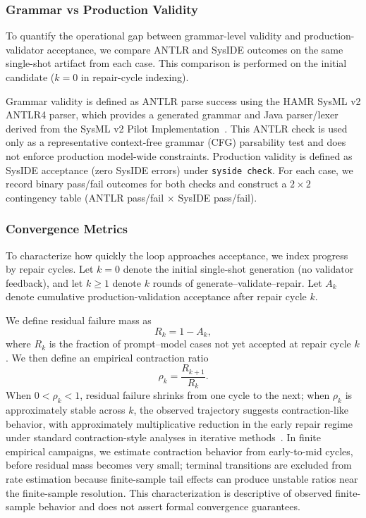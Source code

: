 \subsubsection{Grammar vs Production Validity}
To quantify the operational gap between grammar-level validity and production-validator acceptance, we compare ANTLR and SysIDE outcomes on the same single-shot artifact from each case. This comparison is performed on the initial candidate ($k=0$ in repair-cycle indexing).

Grammar validity is defined as ANTLR parse success using the HAMR SysML v2 ANTLR4 parser, which provides a generated grammar and Java parser/lexer derived from the SysML v2 Pilot Implementation~\cite{hamrSysmlParser2026,sysmlV2PilotImplementation2026}. This ANTLR check is used only as a representative context-free grammar (CFG) parsability test and does not enforce production model-wide constraints. Production validity is defined as SysIDE acceptance (zero SysIDE errors) under \texttt{syside check}. For each case, we record binary pass/fail outcomes for both checks and construct a $2\times2$ contingency table (ANTLR pass/fail $\times$ SysIDE pass/fail).

\subsubsection{Convergence Metrics}
To characterize how quickly the loop approaches acceptance, we index progress by repair cycles. Let $k=0$ denote the initial single-shot generation (no validator feedback), and let $k\geq 1$ denote $k$ rounds of generate--validate--repair. Let $A_k$ denote cumulative production-validation acceptance after repair cycle $k$.

We define residual failure mass as
\[
R_k = 1 - A_k,
\]
where $R_k$ is the fraction of prompt--model cases not yet accepted at repair cycle $k$. We then define an empirical contraction ratio
\[
\rho_k = \frac{R_{k+1}}{R_k}.
\]
When $0 < \rho_k < 1$, residual failure shrinks from one cycle to the next; when $\rho_k$ is approximately stable across $k$, the observed trajectory suggests contraction-like behavior, with approximately multiplicative reduction in the early repair regime under standard contraction-style analyses in iterative methods~\cite{banach1922operations,nocedal2006numerical,he2016averageConvergenceRate}.
In finite empirical campaigns, we estimate contraction behavior from early-to-mid cycles, before residual mass becomes very small; terminal transitions are excluded from rate estimation because finite-sample tail effects can produce unstable ratios near the finite-sample resolution.
This characterization is descriptive of observed finite-sample behavior and does not assert formal convergence guarantees.

